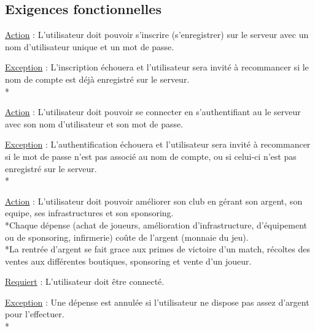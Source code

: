 \documentclass[a4paper]{article}
\begin{document}
	\subsection{Exigences fonctionnelles}
		\begin{description}[style=nextline]
			\item[Inscription :]
			\begin{description}[leftmargin=*] %
				\item[]
				\item \underline{Action} : L'utilisateur doit pouvoir s'inscrire (s'enregistrer) sur le serveur avec un nom d'utilisateur unique et un mot de passe.
				\item \underline{Exception} : L'inscription échouera et l'utilisateur sera invité à recommancer si le nom de compte est déjà enregistré sur le serveur.\\*
			\end{description} %
			
			\item[Connection :]
			\begin{description}[leftmargin=*] %
				\item[]
				\item \underline{Action} : L'utilisateur doit pouvoir se connecter en s'authentifiant au le serveur avec son nom d'utilisateur et son mot de passe.
				\item \underline{Exception} : L'authentification échouera et l'utilisateur sera invité à recommancer si le mot de passe n'est pas associé au nom de compte, ou si celui-ci n'est pas enregistré sur le serveur.\\*
			\end{description} %
			
			\item[Management :]
			\begin{description}[leftmargin=*] %
				\item[]
				\item \underline{Action} : L'utilisateur doit pouvoir améliorer son \gls{club} en gérant son argent, son \gls{equipe}, ses infrastructures et son sponsoring.\\*Chaque dépense (achat de joueurs, amélioration d'infrastructure, d'équipement ou de sponsoring, infirmerie) coûte de l'argent (monnaie du jeu).\\*La rentrée d'argent se fait grace aux primes de victoire d'un match, récoltes des ventes aux différentes boutiques, sponsoring et vente d'un joueur.
				\item \underline{Requiert} : L'utilisateur doit être connecté.
				\item \underline{Exception} : Une dépense est annulée si l'utilisateur ne dispose pas assez d'argent pour l'effectuer.\\*
			\end{description} %
			

\end{description}
\end{document}
